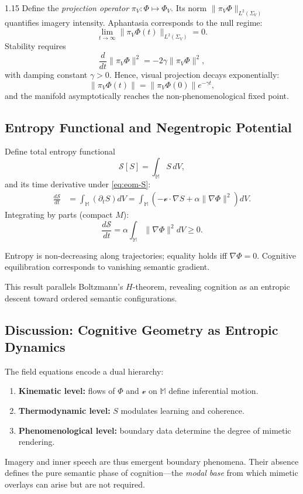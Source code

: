 \documentclass[12pt,a4paper]{article}
\begin{document}
\begin{spacing}{1.15}
Define the \emph{projection operator} \(\pi_V: \Phi \mapsto \Phi_V\).
Its norm \(\|\pi_V\Phi\|_{L^2(\Sigma_V)}\) quantifies imagery intensity.  
Aphantasia corresponds to the null regime:
\[
\lim_{t\to\infty} \|\pi_V\Phi(t)\|_{L^2(\Sigma_V)} = 0.
\]
Stability requires
\[
\frac{d}{dt}\|\pi_V\Phi\|^2 = -2\gamma \|\pi_V\Phi\|^2,
\]
with damping constant \(\gamma>0\).  
Hence, visual projection decays exponentially:
\[
\|\pi_V\Phi(t)\| = \|\pi_V\Phi(0)\| e^{-\gamma t},
\]
and the manifold asymptotically reaches the non-phenomenological fixed point.

\subsection{Entropy Functional and Negentropic Potential}

Define total entropy functional
\[
\mathcal{S}[S] = \int_{\mathbb{M}} S \, dV,
\]
and its time derivative under \eqref{eq:eom-S}:
\begin{align}
\frac{d\mathcal{S}}{dt}
&= \int_{\mathbb{M}} (\partial_t S) dV
= \int_{\mathbb{M}} (-\boldsymbol{\mathcal{v}}\!\cdot\!\nabla S + \alpha\|\nabla\Phi\|^2 ) dV.
\end{align}
Integrating by parts (compact \(M\)):
\[
\frac{d\mathcal{S}}{dt} = \alpha \int_{\mathbb{M}} \|\nabla\Phi\|^2 dV \ge 0.
\]
\begin{corollary}
Entropy is non-decreasing along trajectories; equality holds iff \(\nabla\Phi=0\).  
Cognitive equilibration corresponds to vanishing semantic gradient.
\end{corollary}

This result parallels Boltzmann’s \(H\)-theorem, revealing cognition as an entropic descent toward ordered semantic configurations.

\subsection{Discussion: Cognitive Geometry as Entropic Dynamics}

The field equations encode a dual hierarchy:
\begin{enumerate}[leftmargin=2em]
\item \textbf{Kinematic level:} flows of \(\Phi\) and \(\boldsymbol{\mathcal{v}}\) on \(\mathbb{M}\) define inferential motion.
\item \textbf{Thermodynamic level:} \(S\) modulates learning and coherence.
\item \textbf{Phenomenological level:} boundary data determine the degree of mimetic rendering.
\end{enumerate}
Imagery and inner speech are thus emergent boundary phenomena. Their absence defines the pure semantic phase of cognition—the \emph{modal base} from which mimetic overlays can arise but are not required.


\end{spacing}
\end{document}
